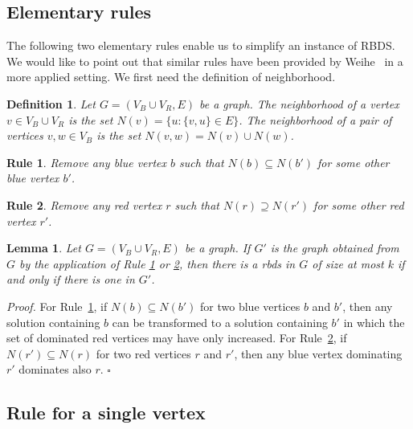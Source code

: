 \documentclass[a4paper,11pt]{article}
\newtheorem{lem}  {Lemma}
\newtheorem{rgl}  {Rule}
\newtheorem{defi} {Definition}
\newcommand{\rrgl}   [1] {Rule~\ref{#1}\xspace}
\newcommand{\drb}    [0] {rbds\xspace}
\newcommand{\RBDS}{\textsc{RBDS}\xspace}
\newenvironment{proof}{\noindent \textit{Proof. }}{\hfill$\square$\vspace{.2cm}}
\begin{document}
\subsection{Elementary rules} \label{elementary}

The following two elementary rules enable us to simplify an instance of \RBDS. We would like to point out that similar rules have been provided by Weihe~\cite{Wei98} in a more applied setting. We first need the definition of neighborhood.

\begin{defi}
Let $G=(V_B\cup V_R,E)$ be a graph.
The \emph{neighborhood} of a vertex $v \in V_B \cup V_R$ is the set $N(v) = \{u : \{v,u\} \in E \}$.
The \emph{neighborhood} of a pair of vertices $v,w \in V_B$ is the set $N(v,w) = N(v) \cup N(w)$.
\end{defi}



\begin{rgl}     \label{rgl_bleu}
Remove any blue vertex $b$ such that $N(b) \subseteq N(b')$ for some other blue vertex $b'$.
\end{rgl}

\begin{rgl}    \label{rgl_rouge}
Remove any red vertex $r$ such that $N(r) \supseteq N(r')$ for some other red vertex $r'$.
\end{rgl}

\begin{lem} \label{lem_corr_elem}
Let $G=(V_B\cup V_R,E)$ be a graph.
If $G'$ is the graph obtained from $G$ by the application of Rule \ref{rgl_bleu} or \ref{rgl_rouge}, then there is a \drb in $G$ of size at most $k$ if and only if there is one in $G'$.
\end{lem}

\begin{proof}
For \rrgl{rgl_bleu}, if $N(b) \subseteq N(b')$ for two blue vertices $b$ and $b'$, then any solution containing $b$ can be transformed to a solution containing $b'$ in which the set of dominated red vertices may have only increased. For \rrgl{rgl_rouge}, if $N(r') \subseteq N(r)$ for two red vertices $r$ and $r'$, then any blue vertex dominating $r'$ dominates also $r$.
\end{proof} 





\subsection{Rule for a single vertex} \label{Rsom}
\end{document}

